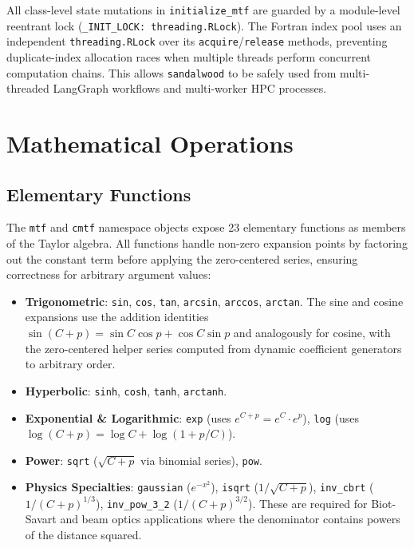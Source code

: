 \documentclass[aps,prb,reprint,superscriptaddress,nofootinbib]{revtex4-2}
\begin{document}
All class-level state mutations in \texttt{initialize\_mtf} are guarded by a module-level reentrant lock (\texttt{\_INIT\_LOCK: threading.RLock}). The Fortran index pool uses an independent \texttt{threading.RLock} over its \texttt{acquire}/\texttt{release} methods, preventing duplicate-index allocation races when multiple threads perform concurrent computation chains. This allows \texttt{sandalwood} to be safely used from multi-threaded LangGraph workflows and multi-worker HPC processes.

\section{Mathematical Operations}
\label{sec:operations}

\subsection{Elementary Functions}

The \texttt{mtf} and \texttt{cmtf} namespace objects expose 23 elementary functions as members of the Taylor algebra. All functions handle non-zero expansion points by factoring out the constant term before applying the zero-centered series, ensuring correctness for arbitrary argument values:

\begin{itemize}
    \item \textbf{Trigonometric}: \texttt{sin}, \texttt{cos}, \texttt{tan}, \texttt{arcsin}, \texttt{arccos}, \texttt{arctan}. The sine and cosine expansions use the addition identities $\sin(C+p) = \sin C\cos p + \cos C\sin p$ and analogously for cosine, with the zero-centered helper series computed from dynamic coefficient generators to arbitrary order.
    \item \textbf{Hyperbolic}: \texttt{sinh}, \texttt{cosh}, \texttt{tanh}, \texttt{arctanh}.
    \item \textbf{Exponential \& Logarithmic}: \texttt{exp} (uses $e^{C+p} = e^C\cdot e^p$), \texttt{log} (uses $\log(C+p) = \log C + \log(1 + p/C)$).
    \item \textbf{Power}: \texttt{sqrt} ($\sqrt{C+p}$ via binomial series), \texttt{pow}.
    \item \textbf{Physics Specialties}: \texttt{gaussian} ($e^{-x^2}$), \texttt{isqrt} ($1/\sqrt{C+p}$), \texttt{inv\_cbrt} ($1/(C+p)^{1/3}$), \texttt{inv\_pow\_3\_2} ($1/(C+p)^{3/2}$). These are required for Biot-Savart and beam optics applications where the denominator contains powers of the distance squared.
\end{itemize}
\end{document}
